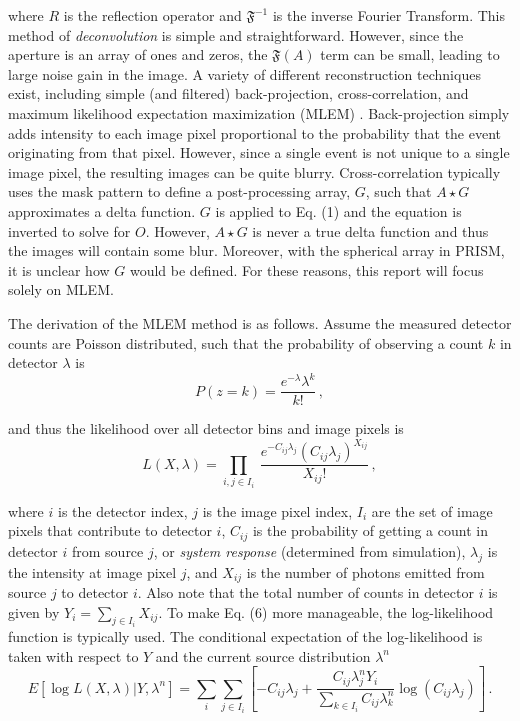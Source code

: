 \documentclass[10pt]{article}
\begin{document}
\noindent where $R$ is the reflection operator and $\mathfrak{F}^{-1}$ is the inverse Fourier Transform. This method of \emph{deconvolution} is simple and straightforward. However, since the aperture is an array of ones and zeros, the $\mathfrak{F}(A)$ term can be small, leading to large noise gain in the image. A variety of different reconstruction techniques exist, including simple (and filtered) back-projection, cross-correlation, and maximum likelihood expectation maximization (MLEM) \cite{LangeCarson1984}. Back-projection simply adds intensity to each image pixel proportional to the probability that the event originating from that pixel. However, since a single event is not unique to a single image pixel, the resulting images can be quite blurry. Cross-correlation typically uses the mask pattern to define a post-processing array, $G$, such that $A\star G$ approximates a delta function. $G$ is applied to Eq. (1) and the equation is inverted to solve for $O$. However, $A\star G$ is never a true delta function and thus the images will contain some blur. Moreover, with the spherical array in PRISM, it is unclear how $G$ would be defined. For these reasons, this report will focus solely on MLEM.

The derivation of the MLEM method is as follows. Assume the measured detector counts are Poisson distributed, such that the probability of observing a count $k$ in detector $\lambda$ is 
%
\begin{equation}
	P(z=k)  = \frac{e^{-\lambda} \lambda^k}{k!}\,,
\end{equation}

\noindent and thus the likelihood over all detector bins and image pixels is 
%
\begin{equation}
	L(X,\lambda) = \prod_{i,j\in I_i} \ \frac{e^{-C_{ij}\lambda_j} (C_{ij}\lambda_j)^{X_{ij}}}{X_{ij}!}\,,
\end{equation}

\noindent where $i$ is the detector index, $j$ is the image pixel index, $I_i$ are the set of image pixels that contribute to detector $i$, $C_{ij}$ is the probability of getting a count in detector $i$ from source $j$, or \emph{system response} (determined from simulation), $\lambda_j$ is the intensity at image pixel $j$, and $X_{ij}$ is the number of photons emitted from source $j$ to detector $i$. Also note that the total number of counts in detector $i$ is given by $Y_i=\sum_{j \in I_i} X_{ij}$. To make Eq. (6) more manageable, the log-likelihood function is typically used. The conditional expectation of the log-likelihood is taken with respect to $Y$ and the current source distribution $\lambda^n$
%
%
\begin{equation}
	E[\log L(X,\lambda) | Y,\lambda^n] = \sum_i \sum_{j \in I_i} \left[   -C_{ij} \lambda_j + \frac{C_{ij}\lambda_j^n Y_i}{\sum_{k \in I_i}C_{ij}\lambda_k^n }   \log (C_{ij} \lambda_j)   \right]\,.
\end{equation}
\end{document}
